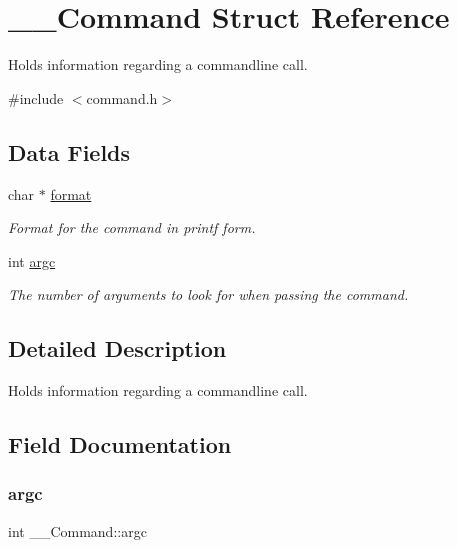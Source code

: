 \hypertarget{struct_____command}{}\section{\+\_\+\+\_\+\+Command Struct Reference}
\label{struct_____command}


Holds information regarding a commandline call.  




{\ttfamily \#include $<$command.\+h$>$}

\subsection*{Data Fields}
\begin{DoxyCompactItemize}
\item 
char $\ast$ \mbox{\hyperlink{struct_____command_a1c0253e6cfc982c6bb80dae3fddb5162}{format}}
\begin{DoxyCompactList}\small\item\em Format for the command in printf form. \end{DoxyCompactList}\item 
int \mbox{\hyperlink{struct_____command_aa6f80bbad8e3e02a754628e3a49d30a4}{argc}}
\begin{DoxyCompactList}\small\item\em The number of arguments to look for when passing the command. \end{DoxyCompactList}\end{DoxyCompactItemize}


\subsection{Detailed Description}
Holds information regarding a commandline call. 

\subsection{Field Documentation}
\mbox{\label{struct_____command_aa6f80bbad8e3e02a754628e3a49d30a4}} 
\subsubsection{\texorpdfstring{argc}{argc}}
{\footnotesize\ttfamily int \+\_\+\+\_\+\+Command\+::argc}



